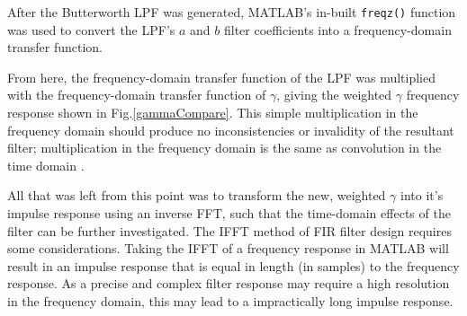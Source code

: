 \documentclass{report}
\begin{document}
            After the Butterworth LPF was generated, MATLAB's in-built \texttt{freqz()} function was used to convert the LPF's $a$ and $b$ filter coefficients into a frequency-domain transfer function.

            From here, the frequency-domain transfer function of the LPF was multiplied with the frequency-domain transfer function of $\gamma$, giving the weighted $\gamma$ frequency response shown in Fig.\ref{gammaCompare}.
            This simple multiplication in the frequency domain should produce no inconsistencies or invalidity of the resultant filter; multiplication in the frequency domain is the same as convolution in the time domain \cite{stanfordConvolution}.
            
            All that was left from this point was to transform the new, weighted $\gamma$ into it's impulse response using an inverse FFT, such that the time-domain effects of the filter can be further investigated.
            The IFFT method of FIR filter design requires some considerations.
            Taking the IFFT of a frequency response in MATLAB will result in an impulse response that is equal in length (in samples) to the frequency response.
            As a precise and complex filter response may require a high resolution in the frequency domain, this may lead to a impractically long impulse response.
\end{document}
